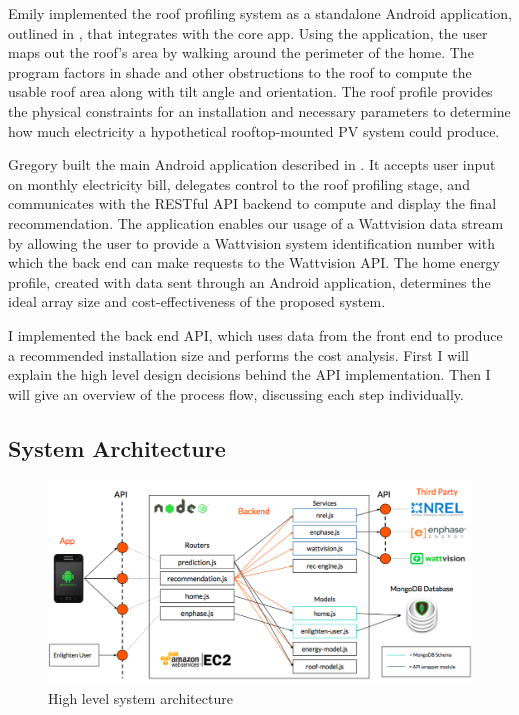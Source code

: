 \documentclass[pageno]{jpaper}
\begin{document}
Emily implemented the roof profiling system as a standalone Android application, outlined in \cite{Speyer}, that integrates with the core app. Using the application, the user maps out the roof's area by walking around the perimeter of the home. The program factors in shade and other obstructions to the roof to compute the usable roof area along with tilt angle and orientation. The roof profile provides the physical constraints for an installation and necessary parameters to determine how much electricity a hypothetical rooftop-mounted PV system could produce.

Gregory built the main Android application described in \cite{Magana}. It accepts user input on monthly electricity bill, delegates control to the roof profiling stage, and communicates with the RESTful API backend to compute and display the final recommendation. The application enables our usage of a Wattvision data stream by allowing the user to provide a Wattvision system identification number with which the back end can make requests to the Wattvision API. The home energy profile, created with data sent through an Android application, determines the ideal array size and cost-effectiveness of the proposed  system. 

I implemented the back end API, which uses data from the front end to produce a recommended installation size and performs the cost analysis. First I will explain the high level design decisions behind the API implementation. Then I will give an overview of the process flow, discussing each step individually. 

\subsection{System Architecture}

\begin{figure}[h]
\begin{center}
\includegraphics[width=\textwidth] {architecture}
\caption{High level system architecture}
\label{fig:architecture}
\end{center}
\end{figure}
\end{document}

